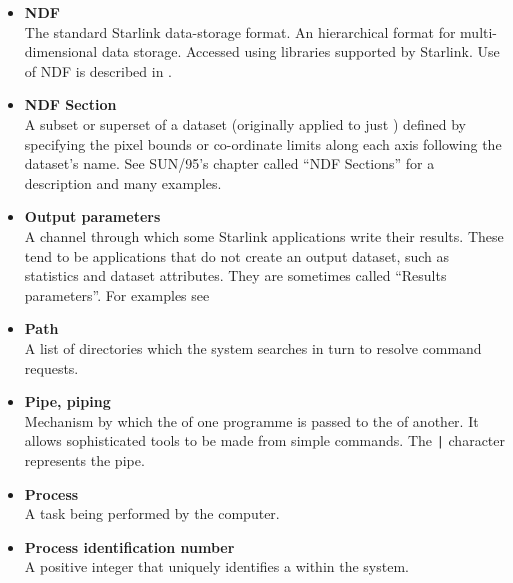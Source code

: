 \documentclass[twoside,11pt,nolof]{starlink}
\providecommand{\latexelsehtml}[2]{#1}
\providecommand{\NDFref}[1]{\xref{#1}{sun33}{}}
\begin{document}
\begin{itemize}
\item {\bf\label{sc4_gl_ndf}NDF}\\
      The standard Starlink data-storage format.  An hierarchical format for
      multi-dimensional data storage.  Accessed using libraries supported
      by Starlink.  Use of NDF is described in \NDFref{SUN/33}.

\item {\bf\label{sc4_gl_ndf_se}NDF Section}\\
      A subset or superset of a dataset (originally applied to just
      ) defined by specifying the pixel bounds
      or co-ordinate limits along each axis following the dataset's name.
      See \latexelsehtml{SUN/95's chapter called ``NDF
      Sections''}{\xref{here}{sun95}{se_ndfsect}} for a description
      and many examples.

\item {\bf\label{sc4_gl_opar}Output parameters}\\
      A channel through which some Starlink applications write their
      results.  These tend to be applications that do not create an
      output dataset, such as statistics and dataset attributes.  They
      are sometimes called ``Results parameters''.  For examples see
\begin{htmlonly}
\end{htmlonly}

\item {\bf\label{sc4_gl_path}Path}\\
      A list of directories which the system searches in turn to
      resolve command requests.

\item {\bf\label{sc4_gl_pipe}Pipe, piping}\\
      Mechanism by which the 
      of one programme is passed to the  of another.  It allows sophisticated tools
      to be made from simple commands.  The \texttt{|} character
      represents the pipe.

\item {\bf\label{sc4_gl_pro}Process}\\
      A task being performed by the computer.

\item {\bf\label{sc4_gl_pid}Process identification number}\\
      A positive integer that uniquely identifies a
       within the system.


\end{itemize}
\end{document}
